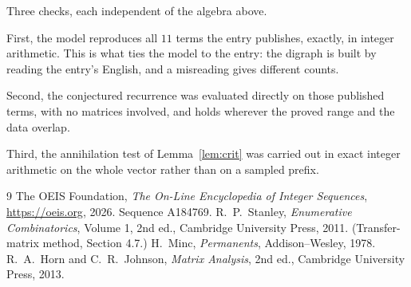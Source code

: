\documentclass[11pt,a4paper]{article}
\theoremstyle{plain}
\theoremstyle{definition}
\begin{document}
Three checks, each independent of the algebra above.

First, the model reproduces all $11$ terms the entry publishes, exactly, in integer
arithmetic. This is what ties the model to the entry: the digraph is built by reading the
entry's English, and a misreading gives different counts.

Second, the conjectured recurrence was evaluated directly on those published terms, with no
matrices involved, and holds wherever the proved range and the data overlap.

Third, the annihilation test of Lemma~\ref{lem:crit} was carried out in exact integer
arithmetic on the whole vector rather than on a sampled prefix.

\begin{thebibliography}{9}
 The OEIS Foundation, \emph{The On-Line Encyclopedia of Integer
Sequences}, \url{https://oeis.org}, 2026. Sequence A184769.
 R.~P.~Stanley, \emph{Enumerative Combinatorics}, Volume 1, 2nd ed.,
Cambridge University Press, 2011. (Transfer-matrix method, Section 4.7.)
 H.~Minc, \emph{Permanents}, Addison--Wesley, 1978.
 R.~A.~Horn and C.~R.~Johnson, \emph{Matrix Analysis}, 2nd ed., Cambridge
University Press, 2013.
\end{thebibliography}
\end{document}
